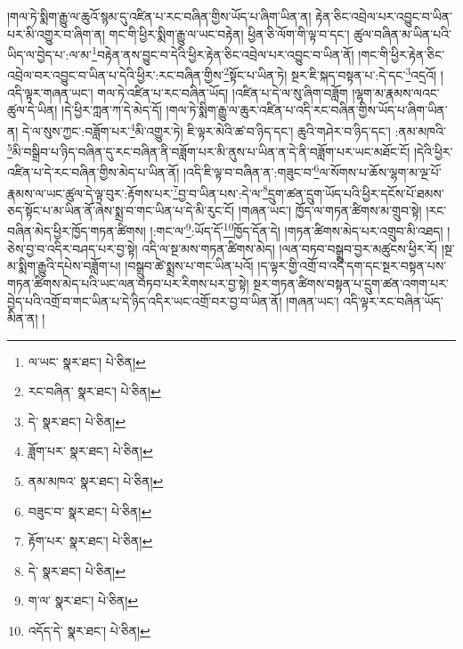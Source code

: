 །གལ་ཏེ་སྨིག་རྒྱུ་ལ་ཆུའོ་སྙམ་དུ་འཛིན་པ་རང་བཞིན་གྱིས་ཡོད་པ་ཞིག་ཡིན་ན། རྟེན་ཅིང་འབྲེལ་པར་འབྱུང་བ་ཡིན་པར་མི་འགྱུར་བ་ཞིག་ན། གང་གི་ཕྱིར་སྨིག་རྒྱུ་ལ་ཡང་བརྟེན། ཕྱིན་ཅི་ལོག་གི་ལྟ་བ་དང་། ཚུལ་བཞིན་མ་ཡིན་པའི་ཡིད་ལ་བྱེད་པ་:ལ་མ་\footnote{ལ་ཡང་  སྣར་ཐང་།  པེ་ཅིན། }བརྟེན་ནས་བྱུང་བ་དེའི་ཕྱིར་རྟེན་ཅིང་འབྲེལ་པར་འབྱུང་བ་ཡིན་ནོ། །གང་གི་ཕྱིར་རྟེན་ཅིང་འབྲེལ་བར་འབྱུང་བ་ཡིན་པ་དེའི་ཕྱིར་:རང་བཞིན་གྱིས་\footnote{རང་བཞིན་  སྣར་ཐང་།  པེ་ཅིན། }སྟོང་པ་ཡིན་ཏེ། སྔར་ཇི་སྐད་བསྟན་པ་:དེ་དང་\footnote{དེ་  སྣར་ཐང་།  པེ་ཅིན། }འདྲའོ། །འདི་ལྟར་གཞན་ཡང་། གལ་ཏེ་འཛིན་པ་རང་བཞིན་ཡོད། །འཛིན་པ་དེ་ལ་སུ་ཞིག་བཟློག །ལྷག་མ་རྣམས་ལའང་ཚུལ་དེ་ཡིན། །དེ་ཕྱིར་ཀླན་ཀ་དེ་མེད་དོ། །གལ་ཏེ་སྨིག་རྒྱུ་ལ་ཆུར་འཛིན་པ་འདི་རང་བཞིན་གྱིས་ཡོད་པ་ཞིག་ཡིན་ན། དེ་ལ་སུས་ཀྱང་:བཟློག་པར་\footnote{ཟློག་པར་  སྣར་ཐང་།  པེ་ཅིན། }མི་འགྱུར་ཏེ། ཇི་ལྟར་མེའི་ཚ་བ་ཉིད་དང་། ཆུའི་གཤེར་བ་ཉིད་དང་། :ནམ་མཁའི་\footnote{ནམ་མཁའ་  སྣར་ཐང་།  པེ་ཅིན། }མི་བསྒྲིབ་པ་ཉིད་བཞིན་དུ་རང་བཞིན་ནི་བཟློག་པར་མི་ནུས་པ་ཡིན་ན་དེ་ནི་བཟློག་པར་ཡང་མཐོང་ངོ། །དེའི་ཕྱིར་འཛིན་པ་དེ་རང་བཞིན་གྱིས་མེད་པ་ཡིན་ནོ། །འདི་ཇི་ལྟ་བ་བཞིན་ན་:གཟུང་བ་\footnote{བཟུང་བ་  སྣར་ཐང་།  པེ་ཅིན། }ལ་སོགས་པ་ཆོས་ལྷག་མ་ལྔ་པོ་རྣམས་ལ་ཡང་ཚུལ་དེ་ལྟ་བུར་:རྟོགས་པར་\footnote{རྟོག་པར་  སྣར་ཐང་།  པེ་ཅིན། }བྱ་བ་ཡིན་པས་:དེ་ལ་\footnote{དེ་  སྣར་ཐང་།  པེ་ཅིན། }དྲུག་ཚན་དྲུག་ཡོད་པའི་ཕྱིར་དངོས་པོ་ཐམས་ཅད་སྟོང་པ་མ་ཡིན་ནོ་ཞེས་སྨྲ་བ་གང་ཡིན་པ་དེ་མི་རུང་ངོ། །གཞན་ཡང་། ཁྱོད་ལ་གཏན་ཚིགས་མ་གྲུབ་སྟེ། །རང་བཞིན་མེད་ཕྱིར་ཁྱོད་གཏན་ཚིགས། །:གང་ལ་\footnote{ག་ལ་  སྣར་ཐང་།  པེ་ཅིན། }:ཡོད་དོ་\footnote{འདོད་དེ་  སྣར་ཐང་།  པེ་ཅིན། }ཁྱོད་དོན་དེ། །གཏན་ཚིགས་མེད་པར་འགྲུབ་མི་འཐད། །ཅེས་བྱ་བ་འདིར་བཤད་པར་བྱ་སྟེ། འདི་ལ་སྔ་མས་གཏན་ཚིགས་མེད། །ལན་བཏབ་བསྒྲུབ་བྱར་མཚུངས་ཕྱིར་རོ། །སྔ་མ་སྨིག་རྒྱུའི་དཔེས་བཟློག་པ། །བསྒྲུབ་ཚེ་སྨྲས་པ་གང་ཡིན་པའོ། །ད་ལྟར་གྱི་འགྲོ་བ་འདི་དག་དང་སྔར་བསྟན་པས་གཏན་ཚིགས་མེད་པའི་ཡང་ལན་བཏབ་པར་རིགས་པར་བྱ་སྟེ། སྔར་གཏན་ཚིགས་བསྟན་པ་དྲུག་ཚན་འགག་པར་བྱེད་པའི་འགྲོ་བ་གང་ཡིན་པ་དེ་ཉིད་འདིར་ཡང་འགྲོ་བར་བྱ་བ་ཡིན་ནོ། །གཞན་ཡང་། འདི་ལྟར་རང་བཞིན་ཡོད་མིན་ན། །
